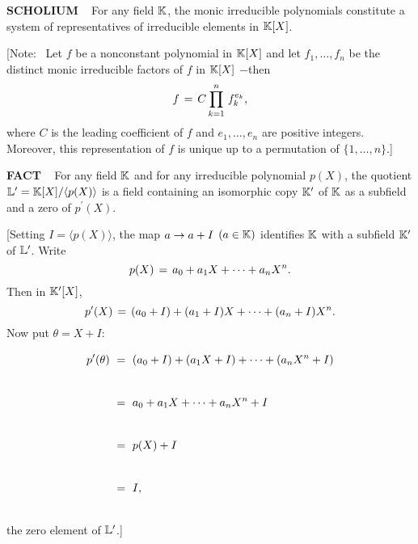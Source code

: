 \vspace{0.1cm}

\begin{x}{\small\bf SCHOLIUM} \ %
For any field $\mathbb{K}$, the monic irreducible polynomials constitute a system of representatives of irreducible elements in $\mathbb{K}[X]$. 

\vspace{0.1cm}

[Note: \ Let $f$ be a nonconstant polynomial in $\mathbb{K}[X]$ and let $f_1, \ldots, f_n$ be the distinct monic irreducible factors of 
$f$ in $\mathbb{K}[X]$ $-$then 
\[
f \hspace{0.05cm} = \hspace{0.05cm} C \prod\limits_{k = 1}^n \hspace{0.05cm} f_k^{e_k},
\]
where $C$ is the leading coefficient of $f$ and $e_1, \ldots, e_n$ are positive integers.  Moreover, 
this representation of $f$ is unique up to a permutation of $\{1, \ldots, n\}$.]
\end{x}

\vspace{0.1cm}


\begin{x}{\small\bf FACT} \ %
For any field $\mathbb{K}$ and for any irreducible polynomial $p(X)$, the quotient 
$\mathbb{L}^\prime = \mathbb{K}[X]/\langle p(X) \rangle$ is a field containing an isomorphic copy $\mathbb{K}^\prime$ of $\mathbb{K}$ as a subfield 
and a zero of $p^\prime(X)$.

\vspace{0.1cm}

[Setting $I = \langle p(X) \rangle$, the map $a \rightarrow a + I$ $(a \in \mathbb{K})$ identifies $\mathbb{K}$ with a subfield $\mathbb{K}^\prime$ 
of $\mathbb{L}^\prime$.  Write
\[
p(X) \hspace{0.05cm} = \hspace{0.05cm} a_0 + a_1 X + \cdots + a_n X^n.
\]
Then in $\mathbb{K}^\prime[X]$, 
\[
p^\prime(X) \hspace{0.05cm} = \hspace{0.05cm} (a_0 + I) + (a_1 + I)X + \cdots + (a_n + I) X^n.
\]
Now put $\theta = X + I$:
\begin{align*}
p^\prime(\theta) \ 
&=\vsx\ (a_0 + I) + (a_1 X + I) + \cdots + (a_n X^n + I)\\
&=\vsx\ a_0 + a_1 X + \cdots + a_n X^n + I\\
&=\vsx\ p(X) + I \\
&=\vsx\ I, 
\end{align*}
the zero element of $\mathbb{L}^\prime$.]
\end{x}

\vspace{0.1cm}




\setcounter{theoremn}{0}

